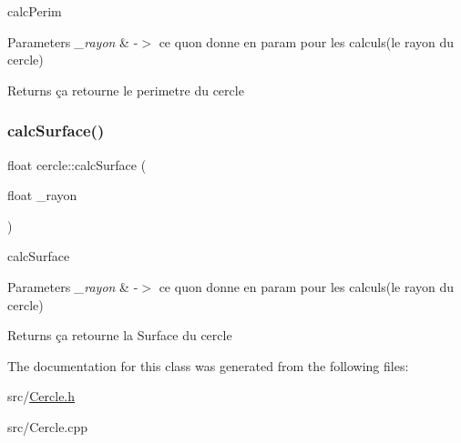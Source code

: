 calc\+Perim 


\begin{DoxyParams}{Parameters}
{\em \+\_\+rayon} & -\/$>$ ce qu\textquotesingle{}on donne en param pour les calculs(le rayon du cercle) \\
\hline
\end{DoxyParams}
\begin{DoxyReturn}{Returns}
ça retourne le perimetre du cercle 
\end{DoxyReturn}
\mbox{\label{classcercle_a6d52510464c33891cac6bf7580d559da}} 
\subsubsection{\texorpdfstring{calc\+Surface()}{calcSurface()}}
{\footnotesize\ttfamily float cercle\+::calc\+Surface (\begin{DoxyParamCaption}\item[{float}]{\+\_\+rayon }\end{DoxyParamCaption})}



calc\+Surface 


\begin{DoxyParams}{Parameters}
{\em \+\_\+rayon} & -\/$>$ ce qu\textquotesingle{}on donne en param pour les calculs(le rayon du cercle) \\
\hline
\end{DoxyParams}
\begin{DoxyReturn}{Returns}
ça retourne la Surface du cercle 
\end{DoxyReturn}


The documentation for this class was generated from the following files\+:\begin{DoxyCompactItemize}
\item 
src/\hyperlink{_cercle_8h}{Cercle.\+h}\item 
src/Cercle.\+cpp\end{DoxyCompactItemize}
